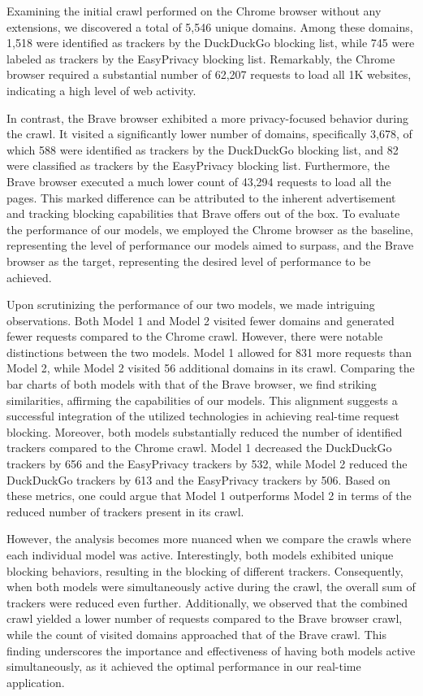 Examining the initial crawl performed on the Chrome browser without any extensions, we discovered a total of 5,546 unique
domains. Among these domains, 1,518 were identified as trackers by the DuckDuckGo blocking list, while 745 were labeled
as trackers by the EasyPrivacy blocking list. Remarkably, the Chrome browser required a substantial number of 62,207
requests to load all 1K websites, indicating a high level of web activity.

In contrast, the Brave browser exhibited a more privacy-focused behavior during the crawl. It visited a significantly
lower number of domains, specifically 3,678, of which 588 were identified as trackers by the DuckDuckGo blocking list, and 82 were
classified as trackers by the EasyPrivacy blocking list. Furthermore, the Brave browser executed a much lower count of 43,294
requests to load all the pages. This marked difference can be attributed to the inherent advertisement and tracking blocking capabilities 
that Brave offers out of the box. To evaluate the performance of our models, we employed the Chrome browser as the baseline,
representing the level of performance our models aimed to surpass, and the Brave browser as the target, representing the desired
level of performance to be achieved.

Upon scrutinizing the performance of our two models, we made intriguing observations. Both Model 1 and Model 2 visited fewer
domains and generated fewer requests compared to the Chrome crawl. However, there were notable distinctions between the two models.
Model 1 allowed for 831 more requests than Model 2, while Model 2 visited 56 additional domains in its crawl. Comparing the bar charts
of both models with that of the Brave browser, we find striking similarities, affirming the capabilities of our models. This alignment
suggests a successful integration of the utilized technologies in achieving real-time request blocking. Moreover, both models
substantially reduced the number of identified trackers compared to the Chrome crawl. Model 1 decreased the DuckDuckGo trackers
by 656 and the EasyPrivacy trackers by 532, while Model 2 reduced the DuckDuckGo trackers by 613 and the EasyPrivacy trackers
by 506. Based on these metrics, one could argue that Model 1 outperforms Model 2 in terms of the reduced number of trackers
present in its crawl.

However, the analysis becomes more nuanced when we compare the crawls where each individual model was active. Interestingly,
both models exhibited unique blocking behaviors, resulting in the blocking of different trackers. Consequently, when both models
were simultaneously active during the crawl, the overall sum of trackers were reduced even further. Additionally, we observed that the
combined crawl yielded a lower number of requests compared to the Brave browser crawl, while the count of visited domains
approached that of the Brave crawl. This finding underscores the importance and effectiveness of having both models active
simultaneously, as it achieved the optimal performance in our real-time application.

